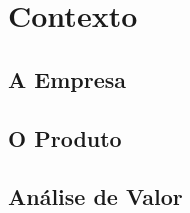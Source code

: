 \chapter{Contexto}
\label{chap:Chapter2}

\section{A Empresa}
\label{sec:chap2_company}

\section{O Produto}
\label{sec:chap2_product}

\section{Análise de Valor}
\label{sec:chap2_valueanalysis}